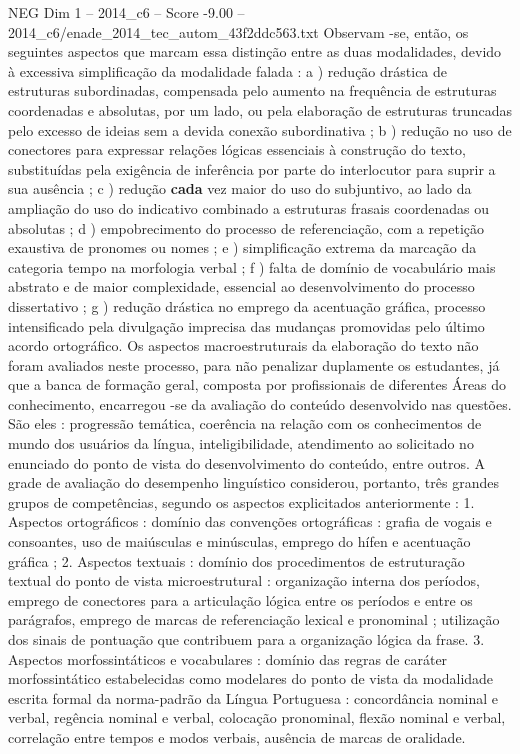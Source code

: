 \begin{textsample}{NEG Dim 1 – 2014\_c6 – Score -9.00 – 2014\_c6/enade\_2014\_tec\_autom\_43f2ddc563.txt}
Observam -se, então, os seguintes aspectos que marcam essa distinção entre as duas modalidades, devido à excessiva simplificação da modalidade falada : a ) redução drástica de estruturas subordinadas, compensada pelo aumento na frequência de estruturas coordenadas e absolutas, por um lado, ou pela elaboração de estruturas truncadas pelo excesso de ideias sem a devida conexão subordinativa ; b ) redução no uso de conectores para expressar relações lógicas essenciais à construção do texto, substituídas pela exigência de inferência por parte do interlocutor para suprir a sua ausência ; c ) redução \textbf{cada} vez maior do uso do subjuntivo, ao lado da ampliação do uso do indicativo combinado a estruturas frasais coordenadas ou absolutas ; d ) empobrecimento do processo de referenciação, com a repetição exaustiva de pronomes ou nomes ; e ) simplificação extrema da marcação da categoria tempo na morfologia verbal ; f ) falta de domínio de vocabulário mais abstrato e de maior complexidade, essencial ao desenvolvimento do processo dissertativo ; g ) redução drástica no emprego da acentuação gráfica, processo intensificado pela divulgação imprecisa das mudanças promovidas pelo último acordo ortográfico.
Os aspectos macroestruturais da elaboração do texto não foram avaliados neste processo, para não penalizar duplamente os estudantes, já que a banca de formação geral, composta por profissionais de diferentes Áreas do conhecimento, encarregou -se da avaliação do conteúdo desenvolvido nas questões.
São eles : progressão temática, coerência na relação com os conhecimentos de mundo dos usuários da língua, inteligibilidade, atendimento ao solicitado no enunciado do ponto de vista do desenvolvimento do conteúdo, entre outros.
A grade de avaliação do desempenho linguístico considerou, portanto, três grandes grupos de competências, segundo os aspectos explicitados anteriormente : 1.
Aspectos ortográficos : domínio das convenções ortográficas : grafia de vogais e consoantes, uso de maiúsculas e minúsculas, emprego do hífen e acentuação gráfica ; 2.
Aspectos textuais : domínio dos procedimentos de estruturação textual do ponto de vista microestrutural : organização interna dos períodos, emprego de conectores para a articulação lógica entre os períodos e entre os parágrafos, emprego de marcas de referenciação lexical e pronominal ; utilização dos sinais de pontuação que contribuem para a organização lógica da frase. 3.
Aspectos morfossintáticos e vocabulares : domínio das regras de caráter morfossintático estabelecidas como modelares do ponto de vista da modalidade escrita formal da norma-padrão da Língua Portuguesa : concordância nominal e verbal, regência nominal e verbal, colocação pronominal, flexão nominal e verbal, correlação entre tempos e modos verbais, ausência de marcas de oralidade.

\end{textsample}
